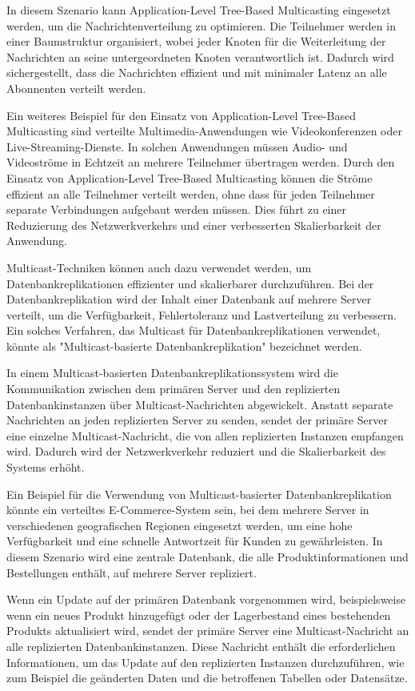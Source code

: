 In diesem Szenario kann Application-Level Tree-Based Multicasting eingesetzt werden, um die Nachrichtenverteilung zu optimieren. Die Teilnehmer werden in einer Baumstruktur organisiert, wobei jeder Knoten für die Weiterleitung der Nachrichten an seine untergeordneten Knoten verantwortlich ist. Dadurch wird sichergestellt, dass die Nachrichten effizient und mit minimaler Latenz an alle Abonnenten verteilt werden.

Ein weiteres Beispiel für den Einsatz von Application-Level Tree-Based Multicasting sind verteilte Multimedia-Anwendungen wie Videokonferenzen oder Live-Streaming-Dienste. In solchen Anwendungen müssen Audio- und Videoströme in Echtzeit an mehrere Teilnehmer übertragen werden. Durch den Einsatz von Application-Level Tree-Based Multicasting können die Ströme effizient an alle Teilnehmer verteilt werden, ohne dass für jeden Teilnehmer separate Verbindungen aufgebaut werden müssen. Dies führt zu einer Reduzierung des Netzwerkverkehrs und einer verbesserten Skalierbarkeit der Anwendung.


Multicast-Techniken können auch dazu verwendet werden, um Datenbankreplikationen effizienter und skalierbarer durchzuführen. Bei der Datenbankreplikation wird der Inhalt einer Datenbank auf mehrere Server verteilt, um die Verfügbarkeit, Fehlertoleranz und Lastverteilung zu verbessern. Ein solches Verfahren, das Multicast für Datenbankreplikationen verwendet, könnte als "Multicast-basierte Datenbankreplikation" bezeichnet werden.

In einem Multicast-basierten Datenbankreplikationssystem wird die Kommunikation zwischen dem primären Server und den replizierten Datenbankinstanzen über Multicast-Nachrichten abgewickelt. Anstatt separate Nachrichten an jeden replizierten Server zu senden, sendet der primäre Server eine einzelne Multicast-Nachricht, die von allen replizierten Instanzen empfangen wird. Dadurch wird der Netzwerkverkehr reduziert und die Skalierbarkeit des Systems erhöht.

Ein Beispiel für die Verwendung von Multicast-basierter Datenbankreplikation könnte ein verteiltes E-Commerce-System sein, bei dem mehrere Server in verschiedenen geografischen Regionen eingesetzt werden, um eine hohe Verfügbarkeit und eine schnelle Antwortzeit für Kunden zu gewährleisten. In diesem Szenario wird eine zentrale Datenbank, die alle Produktinformationen und Bestellungen enthält, auf mehrere Server repliziert.

Wenn ein Update auf der primären Datenbank vorgenommen wird, beispielsweise wenn ein neues Produkt hinzugefügt oder der Lagerbestand eines bestehenden Produkts aktualisiert wird, sendet der primäre Server eine Multicast-Nachricht an alle replizierten Datenbankinstanzen. Diese Nachricht enthält die erforderlichen Informationen, um das Update auf den replizierten Instanzen durchzuführen, wie zum Beispiel die geänderten Daten und die betroffenen Tabellen oder Datensätze.

